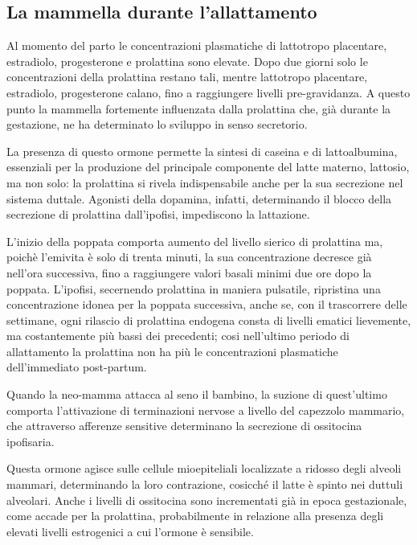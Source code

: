 \documentclass[]{article}
\begin{document}
\hypertarget{la-mammella-durante-lallattamento}{%
\subsection{La mammella durante
l'allattamento}\label{la-mammella-durante-lallattamento}}

Al momento del parto le concentrazioni plasmatiche di lattotropo
placentare, estradiolo, progesterone e prolattina sono elevate. Dopo due
giorni solo le concentrazioni della prolattina restano tali, mentre
lattotropo placentare, estradiolo, progesterone calano, fino a
raggiungere livelli pre-gravidanza. A questo punto la mammella
fortemente influenzata dalla prolattina che, già durante la gestazione,
ne ha determinato lo sviluppo in senso secretorio.

La presenza di questo ormone permette la sintesi di caseina e di
lattoalbumina, essenziali per la produzione del principale componente
del latte materno, lattosio, ma non solo: la prolattina si rivela
indispensabile anche per la sua secrezione nel sistema duttale. Agonisti
della dopamina, infatti, determinando il blocco della secrezione di
prolattina dall'ipofisi, impediscono la lattazione.

L'inizio della poppata comporta aumento del livello sierico di
prolattina ma, poichè l'emivita è solo di trenta minuti, la sua
concentrazione decresce già nell'ora successiva, fino a raggiungere
valori basali minimi due ore dopo la poppata. L'ipofisi, secernendo
prolattina in maniera pulsatile, ripristina una concentrazione idonea
per la poppata successiva, anche se, con il trascorrere delle settimane,
ogni rilascio di prolattina endogena consta di livelli ematici
lievemente, ma costantemente più bassi dei precedenti; cosi nell'ultimo
periodo di allattamento la prolattina non ha più le concentrazioni
plasmatiche dell'immediato post-partum.

Quando la neo-mamma attacca al seno il bambino, la suzione di
quest'ultimo comporta l'attivazione di terminazioni nervose a livello
del capezzolo mammario, che attraverso afferenze sensitive determinano
la secrezione di ossitocina ipofisaria.

Questa ormone agisce sulle cellule mioepiteliali localizzate a ridosso
degli alveoli mammari, determinando la loro contrazione, cosicché il
latte è spinto nei duttuli alveolari. Anche i livelli di ossitocina sono
incrementati già in epoca gestazionale, come accade per la prolattina,
probabilmente in relazione alla presenza degli elevati livelli
estrogenici a cui l'ormone è sensibile.
\end{document}
